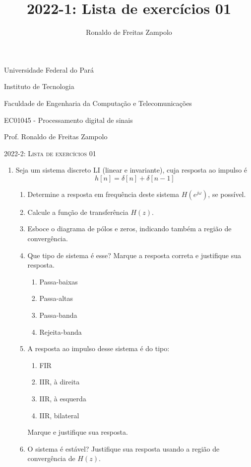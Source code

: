 \documentclass[a4paper,10pt]{article}
\title{2022-1: Lista de exercícios 01}
\author{Ronaldo de Freitas Zampolo}
\begin{document}
Universidade Federal do Pará

Instituto de Tecnologia

Faculdade de Engenharia da Computação e Telecomunicações

EC01045 - Processamento digital de sinais

Prof. Ronaldo de Freitas Zampolo

\begin{center} \textsc{2022-2: Lista de exercícios 01} \end{center}

\begin{enumerate}
	\item Seja um sistema discreto LI (linear e invariante), cuja resposta ao impulso é 
		\begin{equation*}
			h[n] = \delta[n] + \delta[n-1]
		\end{equation*}
		\begin{enumerate}
			\item Determine a resposta em frequência deste sistema $H(e^{j\omega})$, se possível.
			\item Calcule a função de transferência $H(z)$.
			\item Esboce o diagrama de pólos e zeros, indicando também a região de convergência.
			\item Que tipo de sistema é esse? Marque a resposta correta e justifique sua resposta.
				\begin{enumerate}
					\item Passa-baixas
					\item Passa-altas
					\item Passa-banda
					\item Rejeita-banda
				\end{enumerate}
			\item A resposta ao impulso desse sistema é do tipo:
				\begin{enumerate}
					\item FIR
					\item IIR, à direita
					\item IIR, à esquerda
					\item IIR, bilateral
				\end{enumerate}
				Marque e justifique sua resposta.
			\item O sistema é estável? Justifique sua resposta usando a região de convergência de $H(z)$.

\end{enumerate}
\end{enumerate}
\end{document}
